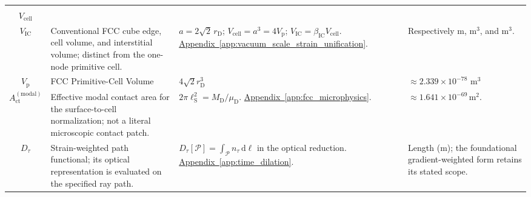 \begin{longtable}{@{} c p{5.5cm} p{4cm} p{3.5cm} @{}}
\begin{tabular}[c]{@{}c@{}}$a$ \\ $V_{\mathrm{cell}}$ \\ $V_{\mathrm{IC}}$\end{tabular} & {\raggedright Conventional FCC cube edge, cell volume, and interstitial volume; distinct from the one-node primitive cell.\par} & {\raggedright $a=2\sqrt2\,r_{\mathrm D}$; $V_{\mathrm{cell}}=a^3=4V_{\mathrm p}$; $V_{\mathrm{IC}}=\beta_{\mathrm{IC}}V_{\mathrm{cell}}$. \newline \hyperref[app:vacuum_scale_strain_unification]{Appendix~\ref*{app:vacuum_scale_strain_unification}}.\par} & {\raggedright Respectively $\mathrm m$, $\mathrm{m^3}$, and $\mathrm{m^3}$.\par} \\


$V_{\mathrm{p}}$ & FCC Primitive-Cell Volume & $4\sqrt{2} r_{\mathrm{D}}^3$ & $\approx 2.339 \times 10^{-78} \text{ m}^3$ \\

$A_{\mathrm{ct}}^{(\mathrm{modal})}$ & {\raggedright Effective modal contact area for the surface-to-cell normalization; not a literal microscopic contact patch.\par} & {\raggedright $2\pi\ell_{\mathrm S}^2=M_{\mathrm D}/\mu_{\mathrm D}$. \newline \hyperref[app:fcc_microphysics]{Appendix~\ref*{app:fcc_microphysics}}.\par} & {\raggedright $\approx1.641\times10^{-69}\,\mathrm{m^2}$.\par} \\

$D_\tau$ & {\raggedright Strain-weighted path functional; its optical representation is evaluated on the specified ray path.\par} & {\raggedright $D_\tau[\mathcal P]=\int_{\mathcal P}n_\tau\,\mathrm d\ell$ in the optical reduction. \newline \hyperref[app:time_dilation]{Appendix~\ref*{app:time_dilation}}.\par} & {\raggedright Length ($\mathrm m$); the foundational gradient-weighted form retains its stated scope.\par} \\


\bottomrule
\end{longtable}

\newpage %

